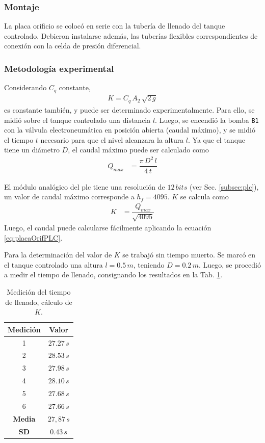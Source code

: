 \subsubsection{Montaje}
La placa orificio se colocó en serie con la tubería de llenado del
tanque controlado.
Debieron instalarse además, las tuberías flexibles correspondientes de conexión
con la celda de presión diferencial.

\subsubsection{Metodología experimental}
Considerando $C_q$ constante,
\begin{align}
 K = C_q\, A_2\, \sqrt{2\,g}
\end{align}
es constante también, y puede ser determinado experimentalmente.
Para ello, se midió sobre el tanque controlado una distancia $l$.
Luego, se encendió la bomba \verb|B1| con la válvula electroneumática en
posición
abierta (caudal máximo), y se midió el tiempo $t$ necesario para que el nivel
alcanzara la altura $l$.
Ya que el tanque tiene un diámetro $D$, el caudal máximo puede ser
calculado como
\begin{align}
 Q_{max} &= \dfrac{\pi\,D^2\,l}{4\,t}
\end{align}

El módulo analógico del \gls{plc} tiene una resolución de $12\,bits$
(ver Sec. \ref{subsec:plc}), un valor de caudal máximo corresponde a $h_f =
4095$.
$K$ se calcula como
\begin{align}
 K &= \dfrac{Q_{max}}{\sqrt{4095}}
\end{align}
Luego, el caudal puede calcularse fácilmente aplicando la ecuación
\eqref{eq:placaOrifPLC}.

Para la determinación del valor de $K$ se trabajó sin tiempo muerto.
Se marcó en el tanque controlado una altura $l=0.5\,m$, teniendo $D=0.2\,m$.
Luego, se procedió a medir el tiempo de llenado, consignando los resultados en
la Tab. \ref{tab:tiempoK}.

\begin{table}[ht]
\renewcommand{\arraystretch}{1.3}
  \centering
  \bgroup
  \begin{tabular}{|c|c|}
  \hline
  Medición & Valor\\
  \hline
  1 & $27.27\,s$ \\
  2 & $28.53\,s$ \\
  3 & $27.98\,s$ \\
  4 & $28.10\,s$ \\
  5 & $27.68\,s$ \\
  6 & $27.66\,s$ \\
  \hline
  \hline
  \textbf{Media} & $27,87\,s$\\
  \textbf{SD} & $0.43\,s$\\
  \hline
  \end{tabular}
  \egroup
  \caption{Medición del tiempo de llenado, cálculo de $K$.}
  \label{tab:tiempoK}
\end{table}


